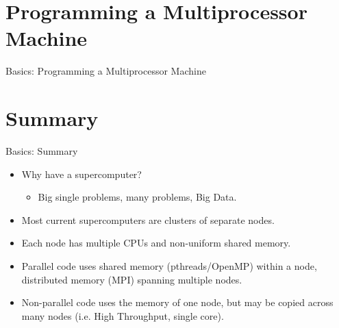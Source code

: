 \section{Programming a Multiprocessor Machine}
\begin{frame}{Basics: Programming a Multiprocessor Machine}

\end{frame}

\section{Summary}

\begin{frame}{Basics: Summary}

  \begin{itemize}
  \item<1->{\alert{Why have a supercomputer?}}
  \begin{itemize}\item<2->{Big single problems, many problems, Big Data.}\end{itemize}
  \item<3->{Most current supercomputers are \alert{clusters} of separate \alert{nodes}.}
  \item<4->{Each node has \alert{multiple CPUs} and \alert{non-uniform shared memory}.}
  \item<5->{\alert{Parallel} code uses shared memory (\alert{pthreads/OpenMP}) within a node, distributed memory (\alert{MPI}) spanning multiple nodes.}
  \item<6->{\alert{Non-parallel} code uses the memory of one node, but may be copied across many nodes (i.e. High Throughput, single core).}
  \end{itemize}
  \end{frame}

